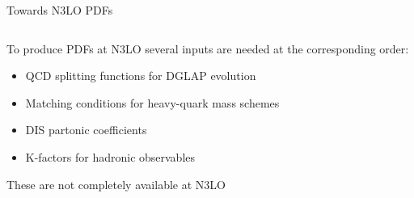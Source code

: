 \documentclass[aspectratio=169, 8pt,t]{beamer}
\begin{document}
\begin{frame}{Towards N3LO PDFs}
  \begin{columns}[T]
    \begin{column}{0.59\textwidth}
      To produce PDFs at N3LO several inputs are needed at the corresponding order:
      \begin{itemize}
        \item QCD splitting functions for DGLAP evolution
        \item Matching conditions for heavy-quark mass schemes
        \item DIS partonic coefficients
        \item K-factors for hadronic observables
      \end{itemize}
    
      These are not completely available at N3LO
    

\end{column}
\end{columns}
\end{frame}
\end{document}
